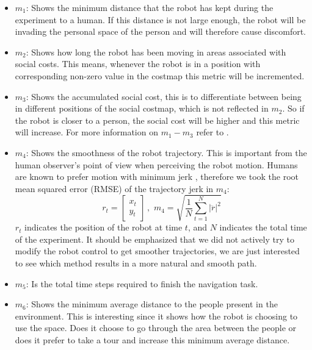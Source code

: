 \begin{itemize}

\item $m_{1}$: Shows the minimum distance that the robot has kept during the experiment to a human. If this distance is not large enough, the robot will be invading the personal space of the person and will therefore cause discomfort. 


\item $m_{2}$: Shows how long the robot has been moving in areas associated with social costs. This means, whenever the robot is in a position with corresponding non-zero value in the costmap this metric will be incremented.

 \item $m_{3}$: Shows the accumulated social cost, this is to differentiate between being in different positions of the social costmap, which is not reflected in $m_{2}$.
 So if the robot is closer to a person, the social cost will be higher and this metric will increase. For more information on $m_{1}-m_{3}$ refer to \cite{talebpour2015board}. 

\item  $m_{4}$: Shows the smoothness of the robot trajectory. This is important from the human observer's point of view when perceiving the robot motion. Humans are known to prefer motion with minimum jerk \cite{sisbot2010synthesizing}, therefore we took the root mean squared error (RMSE) of the trajectory jerk in $m_{4}$:
\begin{equation}
r_{t} = \begin{bmatrix}
x_{t}\\
y_{t} 

\end{bmatrix} \, , \, \,  m_{4} = \sqrt{\frac{1}{N} \sum_{t=1}^{N}\left | \dddot{r} \right |^{2}  }
\end{equation}
$r_{t}$ indicates the position of the robot at time $t$, and $N$ indicates the total time of the experiment. It should be emphasized that we did not actively try to modify the robot control to get smoother trajectories, we are just interested to see which method results in a more natural and smooth path.  

\item $m_{5}$: Is the total time steps required to finish the navigation task.


\item $m_{6}$: Shows the minimum average distance to the people present in the environment. This is interesting since it shows how the robot is choosing to use the space. Does it choose to go through the area between the people or does it prefer to take a tour and increase this minimum average distance.

\end{itemize}

